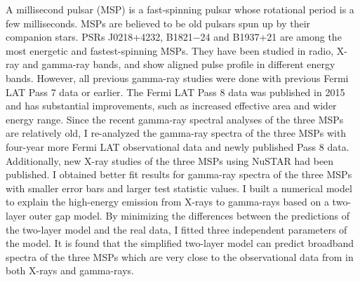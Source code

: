 \documentclass[a4paper, 12pt]{report}
\begin{document}
\begin{titlepage}
    \doublespacing
    A millisecond pulsar (MSP) is a fast-spinning pulsar whose rotational period is a few 
    milliseconds. MSPs are believed to be old pulsars spun up by their companion stars. PSRs
    J0218+4232, B1821$-$24 and B1937+21 are among the most energetic and fastest-spinning  
    MSPs. They have been studied in radio, X-ray and gamma-ray bands, and show 
    aligned pulse profile in different energy bands. However, all previous gamma-ray studies 
    were done with previous Fermi LAT Pass 7 data or earlier. The Fermi LAT Pass 8 data was 
    published in 2015 and has substantial improvements, such as increased effective area and 
    wider energy range. Since the recent gamma-ray spectral analyses of the three MSPs are 
    relatively old, I re-analyzed the gamma-ray spectra of the three MSPs with four-year more 
    Fermi LAT observational data and newly published Pass 8 data. Additionally, new X-ray 
    studies of the three MSPs using NuSTAR had been published. I obtained better fit results
    for gamma-ray spectra of the three MSPs with smaller error bars and larger test statistic 
    values. I built a numerical model to explain the high-energy emission from X-rays to 
    gamma-rays based on a two-layer outer gap model. By minimizing the differences between 
    the predictions of the two-layer model and the real data, I fitted three independent 
    parameters of the model. It is found that the simplified two-layer model can predict 
    broadband spectra of the three MSPs which are very close to the observational data from 
    in both X-rays and gamma-rays.

\end{titlepage}
\end{document}

